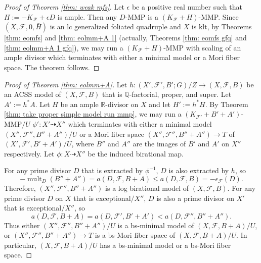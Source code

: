 \documentclass[11pt]{amsart}
\numberwithin{equation}{section}
\newcommand{\Qq}{\mathbb{Q}}
\newcommand{\Rr}{\mathbb{R}}
\newcommand{\mult}{\operatorname{mult}}
\newcommand{\Ff}{\mathcal{F}}
\theoremstyle{definition}
\theoremstyle{definition}
\theoremstyle{definition}
\begin{document}
\begin{proof}[Proof of Theorem \ref{thm: weak mfs}]
    Let $\epsilon$ be a positive real number such that $H:=-K_{\Ff}+\epsilon D$ is ample. Then any $D$-MMP is a $(K_{\Ff}+H)$-MMP. Since $(X,\Ff,0,\bar H)$ is an lc generalized foliated quadruple and $X$ is klt, by  Theorems \ref{thm: eomfs} and \ref{thm: eolmm+A 1} (actually, Theorems \ref{thm: eomfs gfq} and \ref{thm: eolmm+A 1 gfq}), we may run a $(K_{\Ff}+H)$-MMP with scaling of an ample divisor which terminates with either a minimal model or a Mori fiber space. The theorem follows.
\end{proof}

\begin{proof}[Proof of Theorem \ref{thm: eolmm+A}]

Let $h: (X',\Ff',B';G)/Z\rightarrow (X,\Ff,B)$ be an ACSS model of $(X,\Ff,B)$ that is $\Qq$-factorial, proper, and super. Let $A':=h^*A$. Let $H$ be an ample $\Rr$-divisor on $X$ and let $H':=h^*H$. By Theorem \ref{thm: take proper simple model run mmp}, we may run a $(K_{\Ff'}+B'+A')$-MMP$/U$ $\phi': X'\dashrightarrow X''$ which terminates with either a minimal model $(X'',\Ff'',B''+A'')/U$ or a Mori fiber space $(X'',\Ff'',B''+A'')\rightarrow T$ of $(X',\Ff',B'+A')/U$, where $B''$ and $A''$ are the images of $B'$ and $A'$ on $X''$ respectively. Let $\phi: X\dashrightarrow X''$ be the induced birational map.

For any prime divisor $D$ that is extracted by $\phi^{-1}$, $D$ is also extracted by $h$, so $$-\mult_D(B''+A'')=a(D,\Ff,B+A)\leq a(D,\Ff,B)=-\epsilon_{\Ff}(D).$$ 
Therefore, $(X'',\Ff'',B''+A'')$ is a log birational model of $(X,\Ff,B)$. For any prime divisor $D$ on $X$ that is exceptional$/X''$, $D$ is also a prime divisor on $X'$ that is exceptional$/X''$, so 
$$a(D,\Ff,B+A)=a(D,\Ff',B'+A')<a(D,\Ff'',B''+A'').$$
Thus either $(X'',\Ff'',B''+A'')/U$ is a bs-minimal model of $(X,\Ff,B+A)/U$, or $(X'',\Ff'',B''+A'')\rightarrow T$ is a bs-Mori fiber space of $(X,\Ff,B+A)/U$. In particular, $(X,\Ff,B+A)/U$ has a bs-minimal model or a bs-Mori fiber space.
\end{proof}
\end{document}
